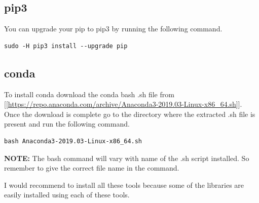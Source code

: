 \documentclass[11pt]{article}
\begin{document}
\subsection*{pip3}
\label{sec-6-2}
You can upgrade your pip to pip3 by running the following command.
\begin{verbatim}
sudo -H pip3 install --upgrade pip
\end{verbatim}
\subsection*{conda}
\label{sec-6-3}
To install conda download the conda bash .sh file from [[\url{https://repo.anaconda.com/archive/Anaconda3-2019.03-Linux-x86_64.sh}]].  
Once the download is complete go to the directory where the extracted .sh file is present  
and run the following command.  
\begin{verbatim}
bash Anaconda3-2019.03-Linux-x86_64.sh
\end{verbatim}
\textbf{\textbf{NOTE:}} The bash command will vary with name of the .sh script installed. So remember  
 to give the correct file name in the command. \newline 

I would recommend to install all these tools because some of the libraries are easily  
installed using each of these tools.  
\end{document}
